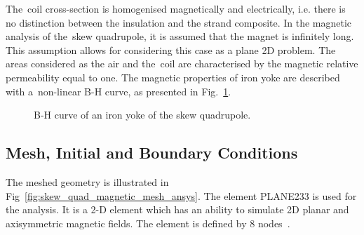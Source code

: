 The~coil cross-section is homogenised magnetically and electrically, i.e. there is no distinction between the insulation and the strand composite. In the magnetic analysis of the~skew quadrupole, it is assumed that the magnet is infinitely long. This assumption allows for considering this case as a plane 2D problem. The areas considered as the air and the~coil are characterised by the magnetic relative permeability equal to one. The magnetic properties of iron yoke are described with a~non-linear B-H curve, as presented in Fig.~\ref{fig:b_h_curve}. 

\begin{figure}[H]
    \centering
    \caption{B-H curve of an iron yoke of the skew quadrupole.}
    \label{fig:b_h_curve}
\end{figure}

\subsection{Mesh, Initial and Boundary Conditions}

The meshed geometry is illustrated in Fig~\ref{fig:skew_quad_magnetic_mesh_ansys}. The element PLANE233 is used for the analysis. It is a 2-D element which has an ability to simulate 2D planar and axisymmetric magnetic fields. The element is defined by 8 nodes~\cite{ansys_element_manual}.

